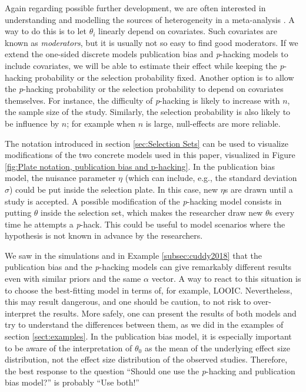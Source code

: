 \documentclass{article}
\theoremstyle{plain}
\theoremstyle{definition}
\begin{document}
Again regarding possible further development, we are often interested in understanding and modelling the sources of heterogeneity in a meta-analysis \citep{thompson1994systematic}. A way to do this is to let $\theta_{i}$ linearly depend on covariates. Such covariates are known as \emph{moderators}, but it is usually not so easy to find good moderators. If we extend the one-sided discrete models publication bias and \textit{p}-hacking models to include covariates, we will be able to estimate their effect while keeping the \textit{p}-hacking probability or the selection probability fixed. Another option is to allow the \textit{p}-hacking probability or the selection probability to depend on covariates themselves. For instance, the difficulty of \textit{p}-hacking is likely to increase with $n$, the sample size of the study. Similarly, the selection probability is also likely to be influence by $n$; for example when $n$ is large, null-effects are more reliable.

The notation introduced in section \ref{sec:Selection Sets} can be used to visualize modifications of the two concrete models used in this paper, visualized in Figure \ref{fig:Plate notation, publication bias and p-hacking}. In the publication bias model, the nuisance parameter $\eta$ (which can include, e.g., the standard deviation $\sigma$) could be put inside the selection plate. In this case, new $\eta$s are drawn until a study is accepted. A possible modification of the \textit{p}-hacking model consists in putting $\theta$ inside the selection set, which makes the researcher draw new $\theta$s every time he attempts a \textit{p}-hack. This could be useful to model scenarios where the hypothesis is not
known in advance by the researchers.

We saw in the simulations and in Example \ref{subsec:cuddy2018} that the publication bias and the \textit{p}-hacking models can give remarkably different results even with similar priors and the same $\alpha$ vector. A way to react to this situation is to choose the best-fitting model in terms of, for example, LOOIC. Nevertheless, this may result dangerous, and one should be caution, to not risk to over-interpret the results. More safely, one can present the results of both models and try to understand the differences between them, as we did in the examples of section \ref{sect:examples}. In the publication bias model, it is especially important to be aware of the interpretation of $\theta_{0}$ as the mean of the underlying effect size distribution, not the effect size distribution of the observed studies. Therefore, the best response to the question \enquote{Should one use the \textit{p}-hacking and publication bias model?} is probably \enquote{Use both!}
\end{document}
